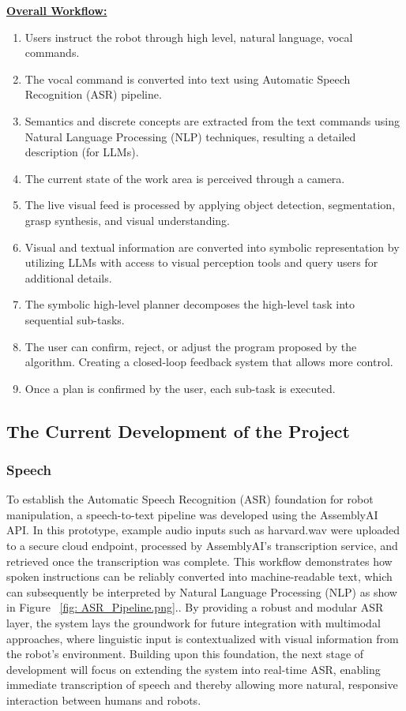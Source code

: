\documentclass[12pt]{extarticle}
\begin{document}
\textbf{\underline{Overall Workflow:}}
\begin{enumerate}
    \item Users instruct the robot through high level, natural language, vocal commands.
    \item The vocal command is converted into text using Automatic Speech Recognition (ASR) pipeline.
    \item Semantics and discrete concepts are extracted from the text commands using Natural Language Processing (NLP) techniques, resulting a detailed description (for LLMs).
    \item The current state of the work area is perceived through a camera.
    \item The live visual feed is processed by applying object detection, segmentation, grasp synthesis, and visual understanding.
    \item Visual and textual information are converted into symbolic representation by utilizing LLMs with access to visual perception tools and query users for additional details.
    \item The symbolic high-level planner decomposes the high-level task into sequential sub-tasks.
    \item The user can confirm, reject, or adjust the program proposed by the algorithm. Creating a closed-loop feedback system that allows more control.
    \item Once a plan is confirmed by the user, each sub-task is executed.

\end{enumerate}

\subsection{The Current Development of the Project}

\subsubsection{Speech}
To establish the Automatic Speech Recognition (ASR) foundation for robot manipulation, a speech-to-text pipeline was developed using the AssemblyAI API. In this prototype, example audio inputs such as harvard.wav were uploaded to a secure cloud endpoint, processed by AssemblyAI’s transcription service, and retrieved once the transcription was complete. This workflow demonstrates how spoken instructions can be reliably converted into machine-readable text, which can subsequently be interpreted by Natural Language Processing (NLP) as show in Figure ~\ref{fig: ASR_Pipeline.png}.. By providing a robust and modular ASR layer, the system lays the groundwork for future integration with multimodal approaches, where linguistic input is contextualized with visual information from the robot’s environment. Building upon this foundation, the next stage of development will focus on extending the system into real-time ASR, enabling immediate transcription of speech and thereby allowing more natural, responsive interaction between humans and robots.
\end{document}
